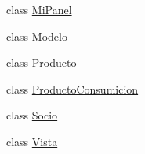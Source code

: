 \begin{DoxyCompactItemize}
\item 
class \mbox{\hyperlink{classsociedad2_1_1_mi_panel}{Mi\+Panel}}
\item 
class \mbox{\hyperlink{classsociedad2_1_1_modelo}{Modelo}}
\item 
class \mbox{\hyperlink{classsociedad2_1_1_producto}{Producto}}
\item 
class \mbox{\hyperlink{classsociedad2_1_1_producto_consumicion}{Producto\+Consumicion}}
\item 
class \mbox{\hyperlink{classsociedad2_1_1_socio}{Socio}}
\item 
class \mbox{\hyperlink{classsociedad2_1_1_vista}{Vista}}
\end{DoxyCompactItemize}
